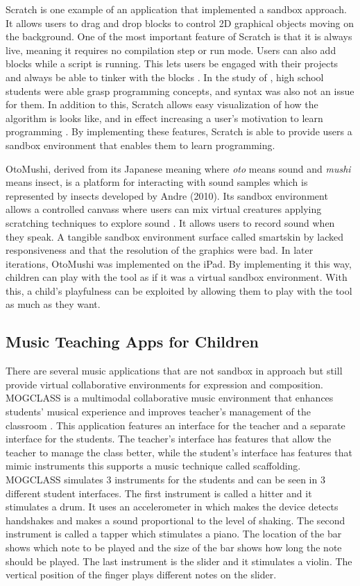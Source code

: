 Scratch is one example of an application that implemented a sandbox approach. It allows users to drag and drop blocks to control 2D graphical objects moving on the background. One of the most important feature of Scratch is that it is always live, meaning it requires no compilation step or run mode. Users can also add blocks while a script is running. This lets users be engaged with their projects and always be able to tinker with the blocks \cite{maloney2010scratch}. In the study of , high school students were able grasp programming concepts, and syntax was also not an issue for them. In addition to this, Scratch allows easy visualization of how the algorithm is looks like, and in effect increasing a user’s motivation to learn programming \cite{erol2017effects}. By implementing these features, Scratch is able to provide users a sandbox environment that enables them to learn programming. 

OtoMushi, derived from its Japanese meaning where \textit{oto} means sound and \textit{mushi} means insect, is a platform for interacting with sound samples which is represented by insects developed by Andre (2010). Its sandbox environment allows a controlled canvass where users can mix virtual creatures applying scratching techniques to explore sound \cite{andre2010otomushi}. It allows users to record sound when they speak. A tangible sandbox environment surface called smartskin by \cite{rekimoto2002smartskin} lacked responsiveness and that the resolution of the graphics were bad. In later iterations, OtoMushi was implemented on the iPad. By implementing it this way, children can play with the tool as if it was a virtual sandbox environment. With this, a child's playfulness can be exploited by allowing them to play with the tool as much as they want.

\subsection{Music Teaching Apps for Children}
There are several music applications that are not sandbox in approach but still provide virtual collaborative environments for expression and composition. MOGCLASS is a multimodal collaborative music environment that enhances students’ musical experience and improves teacher’s management of the classroom \cite{zhou2011mogclass}. This application features an interface for the teacher and a separate interface for the students. The teacher’s interface has features that allow the teacher to manage the class better, while the student’s interface has features that mimic instruments this supports a music technique called scaffolding.
MOGCLASS simulates 3 instruments for the students and can be seen in 3 different student interfaces. The first instrument is called a hitter and it stimulates a drum. It uses an accelerometer in which makes the device detects handshakes and makes a sound proportional to the level of shaking. The second instrument is called a tapper which stimulates a piano. The location of the bar shows which note to be played and the size of the bar shows how long the note should be played. The last instrument is the slider and it stimulates a violin. The vertical position of the finger plays different notes on the slider.


